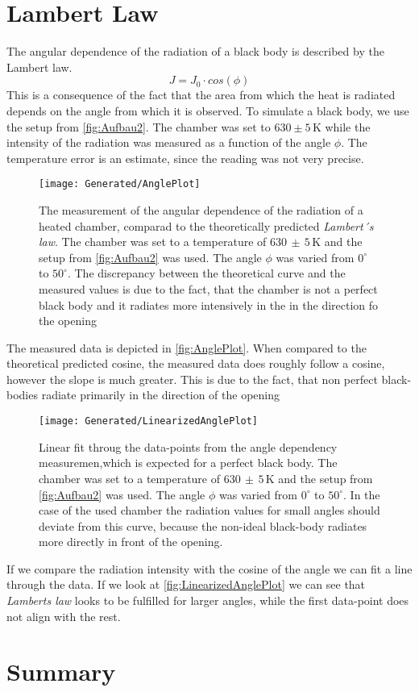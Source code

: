 \documentclass[a4paper,10pt,twocolumn]{article}
\begin{document}
    \section{Lambert Law}\label{sec:lambertLaw}
    The angular dependence of the radiation of a black body is described by the Lambert law.
    \begin{equation}
        J = J_0 \cdot cos(\phi)
    \end{equation}
    This is a consequence of the fact that the area from which the heat is radiated depends on the angle from which it is observed.
    To simulate a black body, we use the setup from \autoref{fig:Aufbau2}.
    The chamber was set to $630 \pm 5\,$K while the intensity of the radiation was measured as a function of the angle $\phi$.
    The temperature error is an estimate, since the reading was not very precise.
    \begin{figure}
        \begin{center}
            \texttt{[image: Generated/AnglePlot]}
            \caption{The measurement of the angular dependence of the radiation of a heated chamber, comparad to the theoretically predicted \textit{Lambert´s law}.
            The chamber was set to a temperature of $630\, \pm \,5\,$K and the setup from \autoref{fig:Aufbau2} was used.
            The angle $\phi$ was varied from $0^\circ$ to $50^\circ $.
            The discrepancy between the theoretical curve and the measured values is due to the fact, that the chamber is not a perfect black body and it radiates more intensively in the in the direction fo the opening}
            \label{fig:AnglePlot}
        \end{center}
    \end{figure}
    The measured data is depicted in \autoref{fig:AnglePlot}.
    When compared to the theoretical predicted cosine, the measured data does roughly follow a cosine, however the slope is much greater.
    This is due to the fact, that non perfect black-bodies radiate primarily in the direction of the opening

    \begin{figure}
        \begin{center}
            \texttt{[image: Generated/LinearizedAnglePlot]}
            \caption{Linear fit throug the data-points from the angle dependency measuremen,which is expected for a perfect black body.
            The chamber was set to a temperature of $630\, \pm \,5\,$K and the setup from \autoref{fig:Aufbau2} was used.
            The angle $\phi$ was varied from $0^\circ$ to $50^\circ $.
            In the case of the used chamber the radiation values for small angles should deviate from this curve,
            because the non-ideal black-body radiates more directly in front of the opening.}
            \label{fig:LinearizedAnglePlot}
        \end{center}
    \end{figure}
    If we compare the radiation intensity with the cosine of the angle we can fit a line through the data.
    If we look at \autoref{fig:LinearizedAnglePlot} we can see that \textit{Lamberts law} looks to be fulfilled for larger angles,
    while the first data-point does not align with the rest.
    
    
    
    
    \section{Summary}
    
\end{document}
